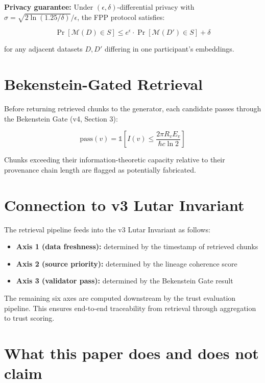 \documentclass[11pt]{article}
\theoremstyle{plain}
\begin{document}
\textbf{Privacy guarantee:} Under \( (\epsilon, \delta) \)-differential privacy with \( \sigma = \sqrt{2 \ln(1.25/\delta)} / \epsilon \), the FPP protocol satisfies:

\begin{equation}
\Pr[\mathcal{M}(D) \in S] \leq e^\epsilon \cdot \Pr[\mathcal{M}(D') \in S] + \delta
\end{equation}

for any adjacent datasets \( D, D' \) differing in one participant's embeddings.


\section{Bekenstein-Gated Retrieval}

Before returning retrieved chunks to the generator, each candidate passes through the Bekenstein Gate (v4, Section 3):

\begin{equation}
\text{pass}(v) = \mathbb{1}\left[ I(v) \leq \frac{2\pi R_v E_v}{\hbar c \ln 2} \right]
\end{equation}

Chunks exceeding their information-theoretic capacity relative to their provenance chain length are flagged as potentially fabricated.


\section{Connection to v3 Lutar Invariant}

The retrieval pipeline feeds into the v3 Lutar Invariant as follows:

\begin{itemize}
  \item \textbf{Axis 1 (data freshness):} determined by the timestamp of retrieved chunks
  \item \textbf{Axis 2 (source priority):} determined by the lineage coherence score
  \item \textbf{Axis 3 (validator pass):} determined by the Bekenstein Gate result
\end{itemize}

The remaining six axes are computed downstream by the trust evaluation pipeline. This ensures end-to-end traceability from retrieval through aggregation to trust scoring.


\section{What this paper does and does not claim}
\end{document}
